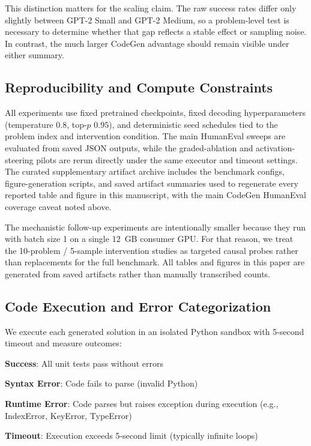 \documentclass[preprint,12pt,authoryear]{elsarticle}
\begin{document}
This distinction matters for the scaling claim. The raw success rates differ only slightly between GPT-2 Small and GPT-2 Medium, so a problem-level test is necessary to determine whether that gap reflects a stable effect or sampling noise. In contrast, the much larger CodeGen advantage should remain visible under either summary.

\subsection{Reproducibility and Compute Constraints}

All experiments use fixed pretrained checkpoints, fixed decoding hyperparameters (temperature $0.8$, top-$p$ $0.95$), and deterministic seed schedules tied to the problem index and intervention condition. The main HumanEval sweeps are evaluated from saved JSON outputs, while the graded-ablation and activation-steering pilots are rerun directly under the same executor and timeout settings. The curated supplementary artifact archive includes the benchmark configs, figure-generation scripts, and saved artifact summaries used to regenerate every reported table and figure in this manuscript, with the main CodeGen HumanEval coverage caveat noted above.

The mechanistic follow-up experiments are intentionally smaller because they run with batch size 1 on a single 12~GB consumer GPU. For that reason, we treat the 10-problem / 5-sample intervention studies as targeted causal probes rather than replacements for the full benchmark. All tables and figures in this paper are generated from saved artifacts rather than manually transcribed counts.

\subsection{Code Execution and Error Categorization}

We execute each generated solution in an isolated Python sandbox with 5-second timeout and measure outcomes:

\textbf{Success}: All unit tests pass without errors

\textbf{Syntax Error}: Code fails to parse (invalid Python)

\textbf{Runtime Error}: Code parses but raises exception during execution (e.g., IndexError, KeyError, TypeError)

\textbf{Timeout}: Execution exceeds 5-second limit (typically infinite loops)
\end{document}
